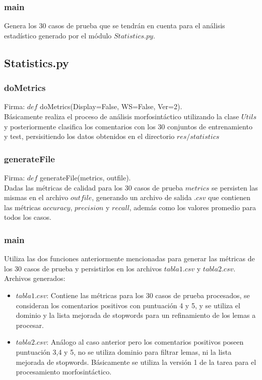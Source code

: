 \documentclass[12pt]{article}
\begin{document}
\subsubsection{main}
Genera los 30 casos de prueba que se tendrán en cuenta para el análisis estadístico generado por el módulo $Statistics.py$.


\subsection{Statistics.py}

\subsubsection{doMetrics}
Firma: $def$ doMetrics(Display=False, WS=False, Ver=2). \\
Básicamente realiza el proceso de análisis morfosintáctico utilizando la clase $Utils$ y posteriormente clasifica los comentarios con los 30 conjuntos de entrenamiento y test, persisitiendo los datos obtenidos en el directorio $res/statistics$

\subsubsection{generateFile}
Firma: $def$ generateFile(metrics, outfile). \\
Dadas las métricas de calidad para los 30 casos de prueba $metrics$ se persisten las mismas en el archivo $outfile$, generando un archivo de salida $.csv$ que contienen las métricas $accuracy$, $precision$ y $recall$, además como los valores promedio para todos los casos.

\subsubsection{main}
Utiliza las dos funciones anteriormente mencionadas para generar las métricas de los 30 casos de prueba y persistirlos en los archivos $tabla1.csv$ y $tabla2.csv$. Archivos generados:
\begin{itemize}
  \item $tabla1.csv$: Contiene las métricas para los 30 casos de prueba procesados, se consideran los comentarios positivos con puntuación 4 y 5, y se utiliza el dominio y la lista mejorada de stopwords para un refinamiento de los lemas a procesar.
  \item $tabla2.csv$: Análogo al caso anterior pero los comentarios positivos poseen puntuación 3,4 y 5, no se utiliza dominio para filtrar lemas, ni la lista mejorada de stopwords. Básicamente se utiliza la versión 1 de la tarea para el procesamiento morfosintáctico.
\end{itemize}
\end{document}
